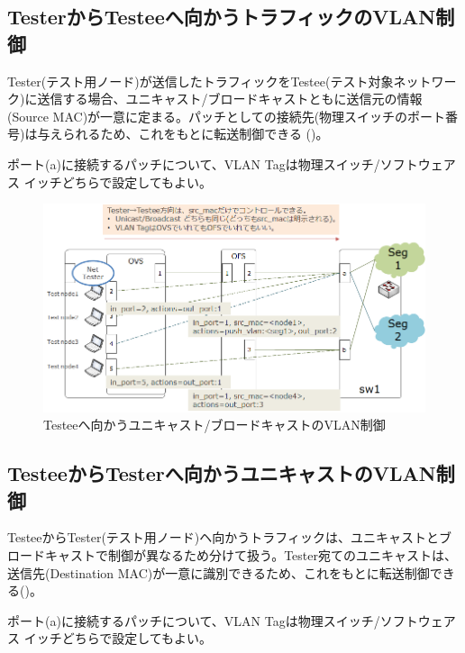   \subsection{TesterからTesteeへ向かうトラフィックのVLAN制御}
  \label{sec:vlan-ctrl-tester2testee}

Tester(テスト用ノード)が送信したトラフィックをTestee(テスト対象ネットワー
ク)に送信する場合、ユニキャスト/ブロードキャストともに送信元の情報
(Source MAC)が一意に定まる。パッチとしての接続先(物理スイッチのポート番
号)は与えられるため、これをもとに転送制御できる
()。

ポート(a)に接続するパッチについて、VLAN Tagは物理スイッチ/ソフトウェアス
イッチどちらで設定してもよい。

\begin{figure}[h]
 \centering
 \includegraphics[scale=0.6]{img/vlan-tester2testee.png}
 \caption{Testeeへ向かうユニキャスト/ブロードキャストのVLAN制御}
 \label{fig:vlan-tester2testee}
\end{figure}

  \subsection{TesteeからTesterへ向かうユニキャストのVLAN制御}
  \label{sec:vlan-ctrl-testee2tester-unicast}

TesteeからTester(テスト用ノード)ヘ向かうトラフィックは、ユニキャストとブ
ロードキャストで制御が異なるため分けて扱う。Tester宛てのユニキャストは、
送信先(Destination MAC)が一意に識別できるため、これをもとに転送制御でき
る()。

ポート(a)に接続するパッチについて、VLAN Tagは物理スイッチ/ソフトウェアス
イッチどちらで設定してもよい。

